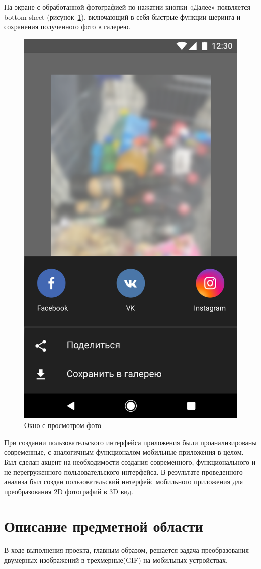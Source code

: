На экране с обработанной фотографией по нажатии кнопки «Далее» появляется bottom sheet (рисунок~\ref{fig:Artboard2}), включающий в себя быстрые функции шеринга и сохранения полученного фото в галерею.

\begin{figure}[H]
	\centering
	\includegraphics[width=0.6\linewidth]{pics/Artboard2}
	\caption{Окно с просмотром фото}
	\label{fig:Artboard2}
\end{figure}

При создании пользовательского интерфейса приложения были проанализированы современные, с аналогичным функционалом мобильные приложения в целом. Был сделан акцент на необходимости создания современного, функционального и не перегруженного пользовательского интерфейса. В результате проведенного анализа был создан пользовательский интерфейс мобильного приложения для преобразования 2D фотографий в 3D вид.




\section{Описание предметной области}
В ходе выполнения проекта, главным образом, решается задача преобразования двумерных изображений в трехмерные(GIF) на мобильных устройствах.

